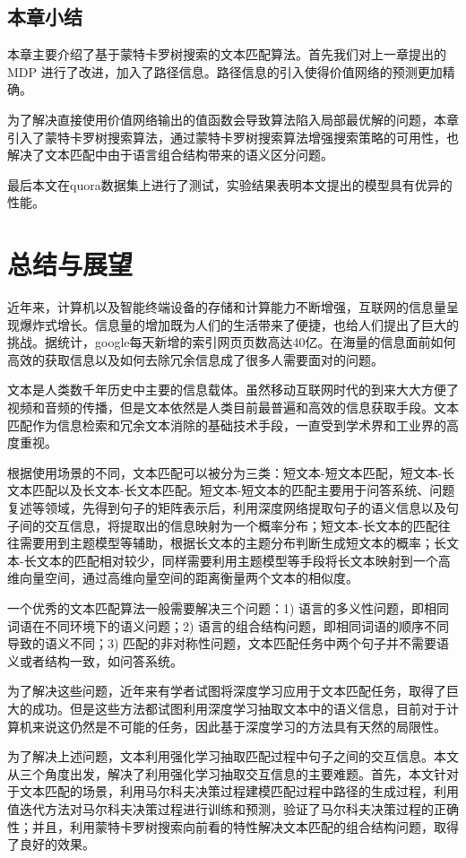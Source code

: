 \section{本章小结}
本章主要介绍了基于蒙特卡罗树搜索的文本匹配算法。首先我们对上一章提出的 MDP 进行了改进，加入了路径信息。路径信息的引入使得价值网络的预测更加精确。

为了解决直接使用价值网络输出的值函数会导致算法陷入局部最优解的问题，本章引入了蒙特卡罗树搜索算法，通过蒙特卡罗树搜索算法增强搜索策略的可用性，也解决了文本匹配中由于语言组合结构带来的语义区分问题。

最后本文在quora数据集上进行了测试，实验结果表明本文提出的模型具有优异的性能。

\chapter{总结与展望}
近年来，计算机以及智能终端设备的存储和计算能力不断增强，互联网的信息量呈现爆炸式增长。信息量的增加既为人们的生活带来了便捷，也给人们提出了巨大的挑战。据统计，google每天新增的索引网页页数高达40亿。在海量的信息面前如何高效的获取信息以及如何去除冗余信息成了很多人需要面对的问题。

文本是人类数千年历史中主要的信息载体。虽然移动互联网时代的到来大大方便了视频和音频的传播，但是文本依然是人类目前最普遍和高效的信息获取手段。文本匹配作为信息检索和冗余文本消除的基础技术手段，一直受到学术界和工业界的高度重视。

根据使用场景的不同，文本匹配可以被分为三类：短文本-短文本匹配，短文本-长文本匹配以及长文本-长文本匹配。短文本-短文本的匹配主要用于问答系统、问题复述等领域，先得到句子的矩阵表示后，利用深度网络提取句子的语义信息以及句子间的交互信息，将提取出的信息映射为一个概率分布；短文本-长文本的匹配往往需要用到主题模型等辅助，根据长文本的主题分布判断生成短文本的概率；长文本-长文本的匹配相对较少，同样需要利用主题模型等手段将长文本映射到一个高维向量空间，通过高维向量空间的距离衡量两个文本的相似度。

一个优秀的文本匹配算法一般需要解决三个问题：1) 语言的多义性问题，即相同词语在不同环境下的语义问题；2) 语言的组合结构问题，即相同词语的顺序不同导致的语义不同；3) 匹配的非对称性问题，文本匹配任务中两个句子并不需要语义或者结构一致，如问答系统。

为了解决这些问题，近年来有学者试图将深度学习应用于文本匹配任务，取得了巨大的成功。但是这些方法都试图利用深度学习抽取文本中的语义信息，目前对于计算机来说这仍然是不可能的任务，因此基于深度学习的方法具有天然的局限性。

为了解决上述问题，文本利用强化学习抽取匹配过程中句子之间的交互信息。本文从三个角度出发，解决了利用强化学习抽取交互信息的主要难题。首先，本文针对于文本匹配的场景，利用马尔科夫决策过程建模匹配过程中路径的生成过程，利用值迭代方法对马尔科夫决策过程进行训练和预测，验证了马尔科夫决策过程的正确性；并且，利用蒙特卡罗树搜索向前看的特性解决文本匹配的组合结构问题，取得了良好的效果。


